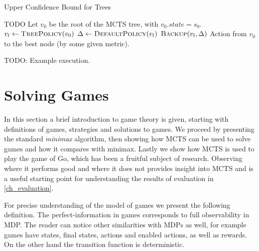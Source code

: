 \begin{algorithm}
    \caption{Upper Confidence Bound for Trees}
\label{uct}
\begin{algorithmic}
    \State TODO
    \State Let $v_0$ be the root of the MCTS tree, with $v_0.state = s_0$.
        \State $v_l \gets \Call{TreePolicy}{v_0}$
        \State $\Delta \gets \Call{DefaultPolicy}{v_l}$
        \State $\Call{Backup}{v_l, \Delta}$
    \EndWhile
    \State \Return Action from $v_0$ to the best node (by some
    given metric).
\EndFunction
\end{algorithmic}
\end{algorithm}


TODO: Example execution.

\section{Solving Games}

In this section a brief introduction to game theory is given, starting
with definitions of games, strategies and solutions to games. We
proceed by presenting the standard {\em minimax} algorithm, then showing
how MCTS can be used to solve games and how it compares with minimax.
Lastly we show how MCTS is used to play the game of Go, which has been a
fruitful subject of research.
Observing where it performs good and where it does not provides insight
into MCTS and is a useful starting point for understanding the results
of evaluation in \autoref{ch_evaluation}.

For precise understanding of the model of games we present the following
definition.
The perfect-information in games corresponds to
full observability in MDP.  The reader can notice other similarities
with MDPs as well, for example games have states, final states, actions
and enabled actions, as well as rewards. On the other hand the
transition function is deterministic.


